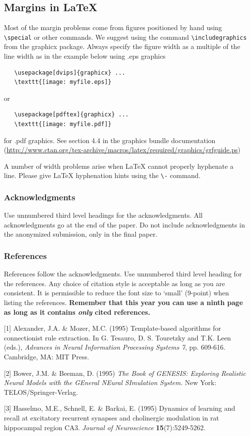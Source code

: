\documentclass{article} %
\begin{document}
\subsection{Margins in LaTeX}

Most of the margin problems come from figures positioned by hand using
\verb+\special+ or other commands. We suggest using the command
\verb+\includegraphics+
from the graphicx package. Always specify the figure width as a multiple of
the line width as in the example below using .eps graphics
\begin{verbatim}
   \usepackage[dvips]{graphicx} ...
   \texttt{[image: myfile.eps]}
\end{verbatim}
or %
\begin{verbatim}
   \usepackage[pdftex]{graphicx} ...
   \texttt{[image: myfile.pdf]}
\end{verbatim}
for .pdf graphics.
See section 4.4 in the graphics bundle documentation (\url{http://www.ctan.org/tex-archive/macros/latex/required/graphics/grfguide.ps})

A number of width problems arise when LaTeX cannot properly hyphenate a
line. Please give LaTeX hyphenation hints using the \verb+\-+ command.


\subsubsection*{Acknowledgments}

Use unnumbered third level headings for the acknowledgments. All
acknowledgments go at the end of the paper. Do not include
acknowledgments in the anonymized submission, only in the
final paper.

\subsubsection*{References}

References follow the acknowledgments. Use unnumbered third level heading for
the references. Any choice of citation style is acceptable as long as you are
consistent. It is permissible to reduce the font size to `small' (9-point)
when listing the references. {\bf Remember that this year you can use
a ninth page as long as it contains \emph{only} cited references.}

\small{
[1] Alexander, J.A. \& Mozer, M.C. (1995) Template-based algorithms
for connectionist rule extraction. In G. Tesauro, D. S. Touretzky
and T.K. Leen (eds.), {\it Advances in Neural Information Processing
Systems 7}, pp. 609-616. Cambridge, MA: MIT Press.

[2] Bower, J.M. \& Beeman, D. (1995) {\it The Book of GENESIS: Exploring
Realistic Neural Models with the GEneral NEural SImulation System.}
New York: TELOS/Springer-Verlag.

[3] Hasselmo, M.E., Schnell, E. \& Barkai, E. (1995) Dynamics of learning
and recall at excitatory recurrent synapses and cholinergic modulation
in rat hippocampal region CA3. {\it Journal of Neuroscience}
{\bf 15}(7):5249-5262.
}
\end{document}
